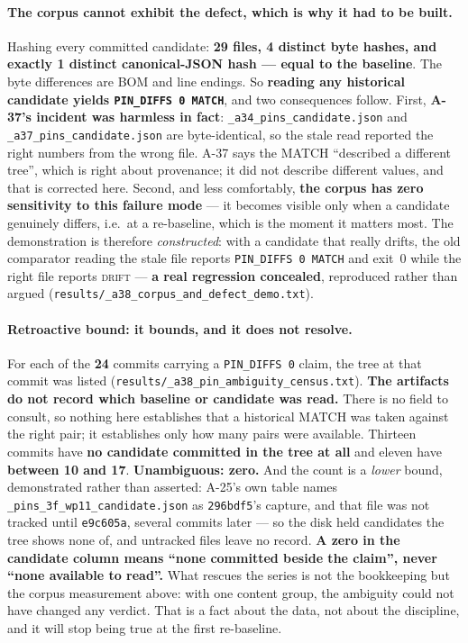 \documentclass[
  10pt,
]{article}
\begin{document}
\paragraph{The corpus cannot exhibit the defect, which is why it had to be built.}
Hashing every committed candidate: \textbf{29 files, 4 distinct byte hashes, and exactly 1 distinct canonical-JSON hash --- equal to the baseline}. The byte differences are BOM and line endings. So \textbf{reading any historical candidate yields \texttt{PIN\_DIFFS 0 MATCH}}, and two consequences follow. First, \textbf{A-37's incident was harmless in fact}: \texttt{\_a34\_pins\_candidate.json} and \texttt{\_a37\_pins\_candidate.json} are byte-identical, so the stale read reported the right numbers from the wrong file. A-37 says the MATCH ``described a different tree'', which is right about provenance; it did not describe different values, and that is corrected here. Second, and less comfortably, \textbf{the corpus has zero sensitivity to this failure mode} --- it becomes visible only when a candidate genuinely differs, i.e.\ at a re-baseline, which is the moment it matters most. The demonstration is therefore \emph{constructed}: with a candidate that really drifts, the old comparator reading the stale file reports \texttt{PIN\_DIFFS 0 MATCH} and exit~0 while the right file reports \textsc{drift} --- \textbf{a real regression concealed}, reproduced rather than argued (\texttt{results/\allowbreak{}\_a38\_corpus\_and\_defect\_demo.txt}).

\paragraph{Retroactive bound: it bounds, and it does not resolve.}
For each of the \textbf{24} commits carrying a \texttt{PIN\_DIFFS 0} claim, the tree at that commit was listed (\texttt{results/\allowbreak{}\_a38\_pin\_ambiguity\_census.txt}). \textbf{The artifacts do not record which baseline or candidate was read.} There is no field to consult, so nothing here establishes that a historical MATCH was taken against the right pair; it establishes only how many pairs were available. Thirteen commits have \textbf{no candidate committed in the tree at all} and eleven have \textbf{between 10 and 17}. \textbf{Unambiguous: zero.} And the count is a \emph{lower} bound, demonstrated rather than asserted: A-25's own table names \texttt{\_pins\_3f\_wp11\_candidate.json} as \texttt{296bdf5}'s capture, and that file was not tracked until \texttt{e9c605a}, several commits later --- so the disk held candidates the tree shows none of, and untracked files leave no record. \textbf{A zero in the candidate column means ``none committed beside the claim'', never ``none available to read''.} What rescues the series is not the bookkeeping but the corpus measurement above: with one content group, the ambiguity could not have changed any verdict. That is a fact about the data, not about the discipline, and it will stop being true at the first re-baseline.
\end{document}
